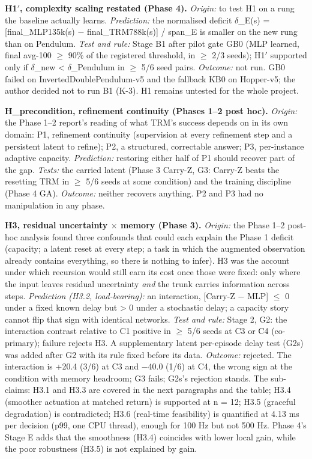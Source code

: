 \documentclass[11pt]{article}
\begin{document}
\textbf{H1$'$, complexity scaling restated (Phase 4).} \emph{Origin:} to test H1 on a rung the baseline actually learns. \emph{Prediction:} the normalised deficit $\delta$\_E(s) = [final\_MLP135k(s) $-$ final\_TRM788k(s)] / span\_E is smaller on the new rung than on Pendulum. \emph{Test and rule:} Stage B1 after pilot gate GB0 (MLP learned, final avg-100 $\geq$ 90\% of the registered threshold, in $\geq$ 2/3 seeds); H1$'$ supported only if $\delta$\_new < $\delta$\_Pendulum in $\geq$ 5/6 seed pairs. \emph{Outcome:} not run. GB0 failed on InvertedDoublePendulum-v5 and the fallback KB0 on Hopper-v5; the author decided not to run B1 (K-3). H1 remains untested for the whole project.



\textbf{H\_precondition, refinement continuity (Phases 1--2 post hoc).} \emph{Origin:} the Phase 1--2 report's reading of what TRM's success depends on in its own domain: P1, refinement continuity (supervision at every refinement step and a persistent latent to refine); P2, a structured, correctable answer; P3, per-instance adaptive capacity. \emph{Prediction:} restoring either half of P1 should recover part of the gap. \emph{Tests:} the carried latent (Phase 3 Carry-Z, G3: Carry-Z beats the resetting TRM in $\geq$ 5/6 seeds at some condition) and the training discipline (Phase 4 GA). \emph{Outcome:} neither recovers anything. P2 and P3 had no manipulation in any phase.



\textbf{H3, residual uncertainty $\times$ memory (Phase 3).} \emph{Origin:} the Phase 1--2 post-hoc analysis found three confounds that could each explain the Phase 1 deficit (capacity; a latent reset at every step; a task in which the augmented observation already contains everything, so there is nothing to infer). H3 was the account under which recursion would still earn its cost once those were fixed: only where the input leaves residual uncertainty \emph{and} the trunk carries information across steps. \emph{Prediction (H3.2, load-bearing):} an interaction, [Carry-Z $-$ MLP] $\leq$ 0 under a fixed known delay but > 0 under a stochastic delay; a capacity story cannot flip that sign with identical networks. \emph{Test and rule:} Stage 2, G2: the interaction contrast relative to C1 positive in $\geq$ 5/6 seeds at C3 or C4 (co-primary); failure rejects H3. A supplementary latent per-episode delay test (G2s) was added after G2 with its rule fixed before its data. \emph{Outcome:} rejected. The interaction is +20.4 (3/6) at C3 and $-$40.0 (1/6) at C4, the wrong sign at the condition with memory headroom; G3 fails; G2s's rejection stands. The sub-claims: H3.1 and H3.3 are covered in the next paragraphs and the table; H3.4 (smoother actuation at matched return) is supported at n = 12; H3.5 (graceful degradation) is contradicted; H3.6 (real-time feasibility) is quantified at 4.13 ms per decision (p99, one CPU thread), enough for 100 Hz but not 500 Hz. Phase 4's Stage E adds that the smoothness (H3.4) coincides with lower local gain, while the poor robustness (H3.5) is not explained by gain.
\end{document}
